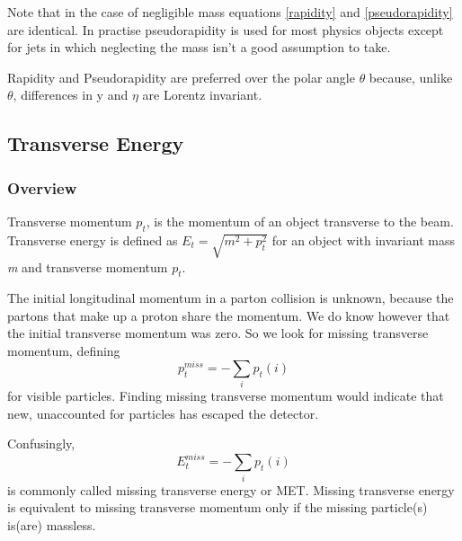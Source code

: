 \documentclass{article}
\begin{document}
Note that in the case of negligible mass equations \ref{rapidity} and \ref{pseudorapidity} are identical. In practise pseudorapidity is used for most physics objects except for jets in which neglecting the mass isn't a good assumption to take.

Rapidity and Pseudorapidity are preferred over the polar angle $\theta$ because, unlike $\theta$, differences in y and $ \eta $ are Lorentz invariant.
\subsection{Transverse Energy}
\label{trans_en}
\subsubsection{Overview}
Transverse momentum $p_{t}$, is the momentum of an object transverse to the beam. Transverse energy is defined as $E_{t} = \sqrt{m^{2} + p^{2}_{t}}$ for an object with invariant mass \emph{m} and transverse momentum $p_{t}$.

The initial longitudinal momentum in a parton collision is unknown, because the partons that make up a proton share the momentum. We do know however that the initial transverse momentum was zero. So we look for missing transverse momentum, defining $$p_{t}^{miss} = - \sum_{i} p_{t}(i)$$ for visible particles. Finding missing transverse momentum would indicate that new, unaccounted for particles has escaped the detector.

Confusingly, $$E_{t}^{miss} = - \sum_{i} p_{t}(i)$$ is commonly called missing transverse energy or MET. Missing transverse energy is equivalent to missing transverse momentum only if the missing particle(s) is(are) massless.
\end{document}
